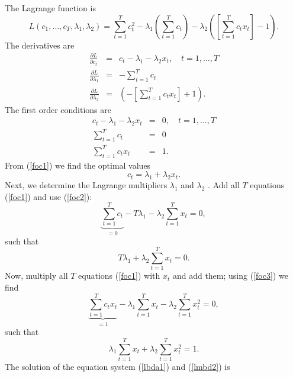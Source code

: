 \documentclass{article}
\begin{document}
The Lagrange function is%
\[
L(c_{1},\ldots ,c_{T},\lambda _{1},\lambda
_{2})=\sum_{t=1}^{T}c_{t}^{2}-\lambda _{1}\left( \sum_{t=1}^{T}c_{t}\right)
-\lambda _{2}\left( \left[ \sum_{t=1}^{T}c_{t}x_{t}\right] -1 \right) . 
\]%
The derivatives are
\begin{eqnarray*}
\frac{\partial L}{\partial c_{t}} &=&c_{t}-\lambda _{1}-\lambda
_{2}x_{t},\quad t=1,\ldots ,T \\
\frac{\partial L}{\partial \lambda _{1}} &=&-\sum_{t=1}^{T}c_{t} \\
\frac{\partial L}{\partial \lambda _{2}} &=&\left( -\left[
\sum_{t=1}^{T}c_{t}x_{t}\right] +1\right) .
\end{eqnarray*}
The first order conditions are
\begin{eqnarray}
c_t-\lambda_1-\lambda_2 x_t &=&0,\quad t=1,\ldots ,T  \label{foc1}\\
\sum_{t=1}^{T}c_{t} &=&0  \label{foc2} \\
\sum_{t=1}^{T}c_{t}x_{t} &=&1.  \label{foc3}
\end{eqnarray}
From (\ref{foc1}) we find the optimal values
\begin{equation}
c_{t}=\lambda _{1}+\lambda _{2}x_{t}. \label{copt}
\end{equation}
Next, we determine the Lagrange multipliers $\lambda _{1}$ and $\lambda _{2}$%
. Add all $T$ equations (\ref{foc1}) and use (\ref{foc2}):
\[ \underbrace{\sum_{t=1}^{T}c_{t}}_{=0}-T\lambda _{1}-\lambda
_{2}\sum_{t=1}^{T}x_{t}=0, \]
such that
\begin{equation}
T\lambda _{1}+\lambda _{2}\sum_{t=1}^{T}x_{t}=0.  \label{lbda1}
\end{equation}
Now, multiply all $T$ equations (\ref{foc1}) with $x_{t}$ and add them;
using (\ref{foc3}) we find
\[
\underbrace{\sum_{t=1}^{T}c_{t}x_{t}}_{=1}-\lambda
_{1}\sum_{t=1}^{T}x_{t}-\lambda _{2}\sum_{t=1}^{T}x_{t}^{2}=0, 
\]
such that
\begin{equation}
\lambda _{1}\sum_{t=1}^{T}x_{t}+\lambda _{2}\sum_{t=1}^{T}x_{t}^{2}=1.
\label{lmbd2}
\end{equation}
The solution of the equation system (\ref{lbda1}) and (\ref{lmbd2}) is
\end{document}

